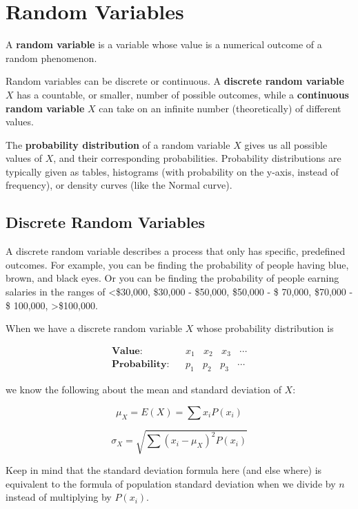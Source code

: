 \documentclass[
]{book}
\theoremstyle{definition}
\theoremstyle{definition}
\theoremstyle{definition}
\theoremstyle{definition}
\theoremstyle{remark}
\begin{document}
\hypertarget{random-variables}{%
\chapter{Random Variables}\label{random-variables}}

A \textbf{random variable} is a variable whose value is a numerical outcome
of a random phenomenon.

Random variables can be discrete or continuous. A \textbf{discrete random
variable} \(X\) has a countable, or smaller, number of possible outcomes,
while a \textbf{continuous random variable} \(X\) can take on an infinite
number (theoretically) of different values.

The \textbf{probability distribution} of a random variable \(X\) gives us all
possible values of \(X\), and their corresponding probabilities.
Probability distributions are typically given as tables, histograms
(with probability on the y-axis, instead of frequency), or density
curves (like the Normal curve).

\hypertarget{discrete-random-variables}{%
\section{Discrete Random Variables}\label{discrete-random-variables}}

A discrete random variable describes a process that only has specific,
predefined outcomes. For example, you can be finding the probability of
people having blue, brown, and black eyes. Or you can be finding the
probability of people earning salaries in the ranges of \textless\$30,000,
\$30,000 - \$50,000, \$50,000 - \$ 70,000, \$70,000 - \$ 100,000,
\textgreater\$100,000.

When we have a discrete random variable \(X\) whose probability
distribution is

\[
\begin{aligned}
    \textbf{Value:}& ~~~~ x_1 ~~~~ x_2 ~~~~ x_3 ~~~~ \cdots \\
    \textbf{Probability:}& ~~~~ p_1 ~~~~ p_2 ~~~~ p_3 ~~~~\cdots
\end{aligned}
\]

we know the following about the mean and standard deviation of \(X\):

\[\mu_X = E(X) = \sum x_i P(x_i)\]

\[\sigma_X = \sqrt{\sum \left( x_i - \mu_X \right) ^2 P \left( x_i \right)}\]

Keep in mind that the standard deviation formula here (and else
where) is equivalent to the formula of population standard deviation
when we divide by \(n\) instead of multiplying by \(P(x_i)\).
\end{document}
